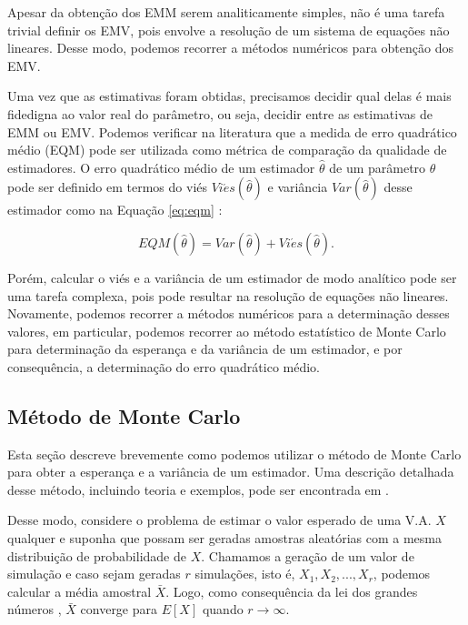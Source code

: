 \documentclass[12pt]{article}
\theoremstyle{definition}
\begin{document}
Apesar da obtenção dos EMM serem analiticamente simples, não é uma tarefa trivial definir os EMV, pois envolve a resolução de um sistema de equações não lineares. Desse modo, podemos recorrer a métodos numéricos para obtenção dos EMV.

Uma vez que as estimativas foram obtidas, precisamos decidir qual delas é mais fidedigna ao valor real do parâmetro, ou seja, decidir entre as estimativas de EMM ou EMV. Podemos verificar na literatura que a medida de erro quadrático médio (EQM) pode ser utilizada como métrica de comparação da qualidade de estimadores. O erro quadrático médio de um estimador $\hat \theta$ de um parâmetro $\theta$ pode ser definido em termos do viés $Vi\acute es(\hat \theta)$ e variância $Var(\hat \theta)$ desse estimador como na Equação \ref{eq:eqm} \cite{bolfarine2010}:

\begin{equation*}
    \label{eq:eqm}
    EQM(\hat \theta) = Var(\hat \theta) + Vi\acute es(\hat \theta).
\end{equation*}

Porém, calcular o viés e a variância de um estimador de modo analítico pode ser uma tarefa complexa, pois pode resultar na resolução de equações não lineares. Novamente, podemos recorrer a métodos numéricos para a determinação desses valores, em particular, podemos recorrer ao método estatístico de Monte Carlo para determinação da esperança e da variância de um estimador, e por consequência, a determinação do erro quadrático médio. 


\subsection{Método de Monte Carlo}

Esta seção descreve brevemente como podemos utilizar o método de Monte Carlo para obter a esperança e a variância de um estimador. Uma descrição detalhada desse método, incluindo teoria e exemplos, pode ser encontrada em \cite{robert2000}.

Desse modo, considere o problema de estimar o valor esperado de uma V.A. $X$ qualquer e suponha que possam ser geradas amostras aleatórias com a mesma distribuição de probabilidade de $X$. Chamamos a geração de um valor de simulação e caso sejam geradas $r$ simulações, isto é, $X_1, X_2, ..., X_r$, podemos calcular a média amostral $\bar{X}$. Logo, como consequência da lei dos grandes números \cite{ross2009}, $\bar{X}$ converge para $E[X]$ quando $r \to \infty$.
\end{document}
